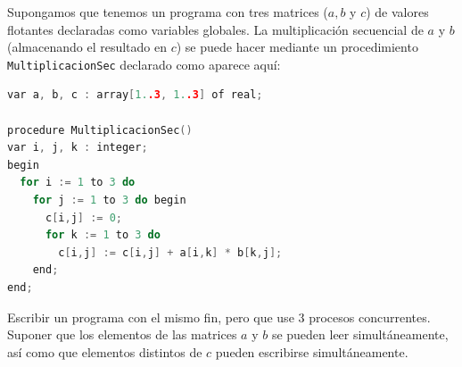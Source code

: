 \begin{ejercicio}
Supongamos que tenemos un programa con tres matrices ($a, b$ y $c$) de valores flotantes declaradas como variables globales. La multiplicación secuencial de $a$ y $b$ (almacenando el resultado en $c$) se puede hacer mediante un procedimiento \texttt{MultiplicacionSec} declarado como aparece aquí:

\begin{lstlisting}[language=C++]
var a, b, c : array[1..3, 1..3] of real;

procedure MultiplicacionSec()
var i, j, k : integer;
begin
  for i := 1 to 3 do
    for j := 1 to 3 do begin
      c[i,j] := 0;
      for k := 1 to 3 do
        c[i,j] := c[i,j] + a[i,k] * b[k,j];
    end;
end;
\end{lstlisting}
Escribir un programa con el mismo fin, pero que use 3 procesos concurrentes. Suponer que los elementos de las matrices $a$ y $b$ se pueden leer simultáneamente, así como que elementos distintos de $c$ pueden escribirse simultáneamente.
\end{ejercicio}

